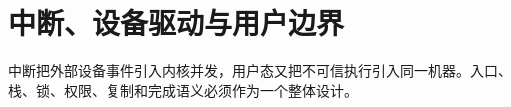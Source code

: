 \chapter{中断、设备驱动与用户边界}

\begin{keyidea}
中断把外部设备事件引入内核并发，用户态又把不可信执行引入同一机器。入口、
栈、锁、权限、复制和完成语义必须作为一个整体设计。
\end{keyidea}




